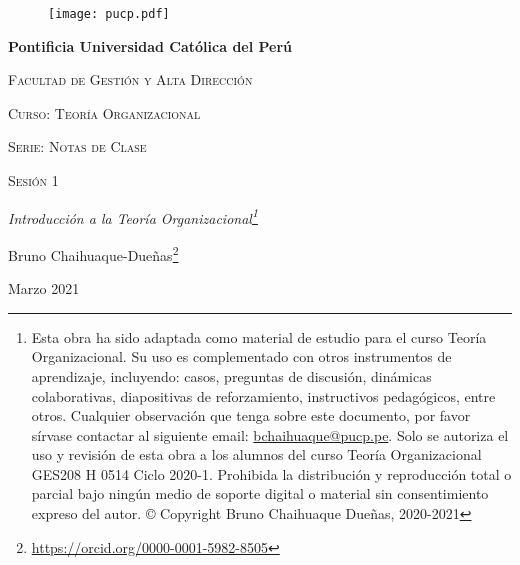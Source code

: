 \begin{titlepage}
	\centering
		\begin{figure}[h]
		\centering
		\texttt{[image: pucp.pdf]}
	\end{figure}
	{\bfseries\LARGE Pontificia Universidad Católica del Perú \par}
	\vspace{0.2cm}
	{\scshape\Large Facultad de Gestión y Alta Dirección \par}
	\vspace{3cm}
	{\scshape\Large Curso: Teoría Organizacional \par}
	{\scshape\large Serie: Notas de Clase\par}	
	\vspace{1cm}
	{\scshape\large Sesión 1 \par}
	
	\vspace{3cm}
	{\itshape\Large Introducción a la Teoría Organizacional\footnote{Esta obra ha sido adaptada como material de estudio para el curso Teoría Organizacional. Su uso es complementado con otros instrumentos de aprendizaje, incluyendo: casos, preguntas de discusión, dinámicas colaborativas, diapositivas de reforzamiento, instructivos pedagógicos, entre otros. Cualquier observación que tenga sobre este documento, por favor sírvase contactar al siguiente email: \href{mailto:bchaihuaque@pucp.pe}{bchaihuaque@pucp.pe}. 
			Solo se autoriza el uso y revisión de esta obra a los alumnos del curso Teoría Organizacional GES208 H 0514 Ciclo 2020-1. Prohibida la distribución y reproducción total o parcial bajo ningún medio de soporte digital o material sin consentimiento expreso del autor. © Copyright Bruno Chaihuaque Dueñas, 2020-2021
		}
		\par}
	\vspace{3cm}
	{\Large Bruno Chaihuaque-Dueñas\footnote{\url{https://orcid.org/0000-0001-5982-8505}}\par}
	{\Large Marzo 2021 \par}
\end{titlepage}
